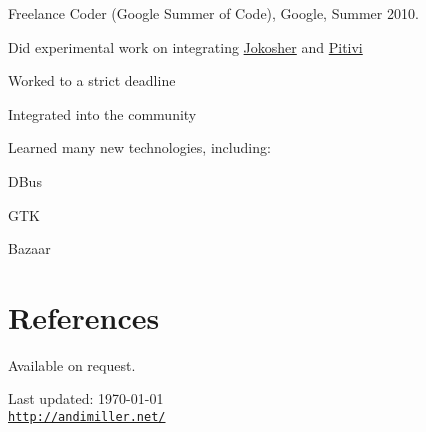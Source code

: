\documentclass[a4paper]{article}
\def\footerlink{http://andimiller.net/}
\renewenvironment{itemize}{
  \begin{list}{}{
    \setlength{\leftmargin}{1.5em}
  }
}{
  \end{list}
}
\newenvironment{packed}{
\begin{itemize}
  \setlength{\itemsep}{0pt}
  \setlength{\parskip}{0pt}
  \setlength{\parsep}{0pt}
}{\end{itemize}}
\begin{document}
\begin{itemize}
\item Freelance Coder (Google Summer of Code), Google, Summer 2010.
	\begin{packed}
    \item Did experimental work on integrating \href{https://launchpad.net/jokosher/}{Jokosher} and \href{http://www.pitivi.org/}{Pitivi}
	\item Worked to a strict deadline
	\item Integrated into the community
	\item Learned many new technologies, including:
		\begin{packed}
		\item DBus
		\item GTK
		\item Bazaar
		\end{packed}
	\end{packed}
\end{itemize}
%
%

\section*{References}
Available on request.

\vfill

\begin{center}
  \begin{footnotesize}
    Last updated: \today \\
    \href{\footerlink}{\texttt{\footerlink}}
  \end{footnotesize}
\end{center}
\end{document}
